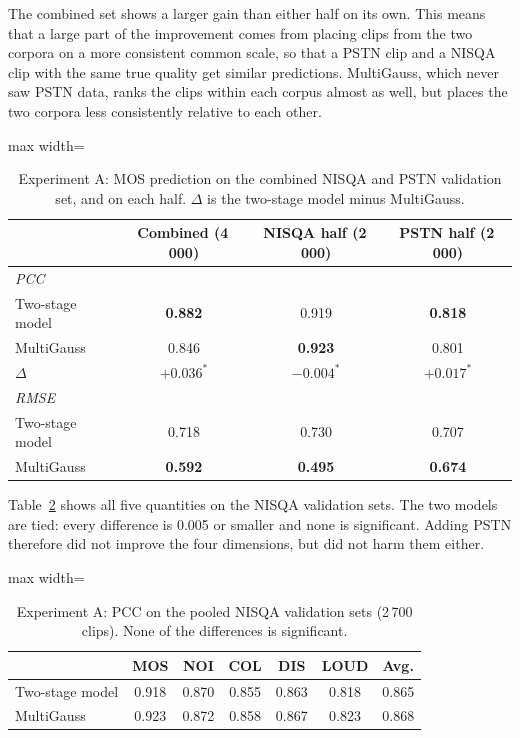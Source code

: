 \documentclass[
english,                 %
bibtex,                  %
includeExtraAbstracts, %
]{kththesis}
\numberwithin{listing}{chapter}
\begin{document}
The combined set shows a larger gain than either half on its own. This means that a large part of the improvement comes from placing clips from the two corpora on a more consistent common scale, so that a PSTN clip and a NISQA clip with the same true quality get similar predictions. MultiGauss, which never saw PSTN data, ranks the clips within each corpus almost as well, but places the two corpora less consistently relative to each other.

\begin{table}[!ht]
  \centering
  \caption{Experiment A: MOS prediction on the combined NISQA and PSTN validation set, and on each half. $\Delta$ is the two-stage model minus MultiGauss.}
  \label{tab:expAMix}
  \begin{adjustbox}{max width=\textwidth}
  \begin{tabular}{lccc}
    \toprule
     & Combined (4\,000) & NISQA half (2\,000) & PSTN half (2\,000) \\
    \midrule
    \multicolumn{4}{l}{\emph{PCC}} \\
    Two-stage model & \textbf{0.882} & 0.919 & \textbf{0.818} \\
    MultiGauss      & 0.846 & \textbf{0.923} & 0.801 \\
    $\Delta$        & $+0.036^{*}$ & $-0.004^{*}$ & $+0.017^{*}$ \\
    \midrule
    \multicolumn{4}{l}{\emph{RMSE}} \\
    Two-stage model & 0.718 & 0.730 & 0.707 \\
    MultiGauss      & \textbf{0.592} & \textbf{0.495} & \textbf{0.674} \\
    \bottomrule
  \end{tabular}
  \end{adjustbox}
\end{table}

Table~\ref{tab:expANisqaVal} shows all five quantities on the NISQA validation sets. The two models are tied: every difference is 0.005 or smaller and none is significant. Adding PSTN therefore did not improve the four dimensions, but did not harm them either.

\begin{table}[!ht]
  \centering
  \caption{Experiment A: PCC on the pooled NISQA validation sets (2\,700 clips). None of the differences is significant.}
  \label{tab:expANisqaVal}
  \setlength{\tabcolsep}{4pt}
  \begin{adjustbox}{max width=\textwidth}
  \begin{tabular}{lcccccc}
    \toprule
     & MOS & NOI & COL & DIS & LOUD & Avg. \\
    \midrule
    Two-stage model & 0.918 & 0.870 & 0.855 & 0.863 & 0.818 & 0.865 \\
    MultiGauss      & 0.923 & 0.872 & 0.858 & 0.867 & 0.823 & 0.868 \\
    \bottomrule
  \end{tabular}
  \end{adjustbox}
\end{table}
\end{document}
